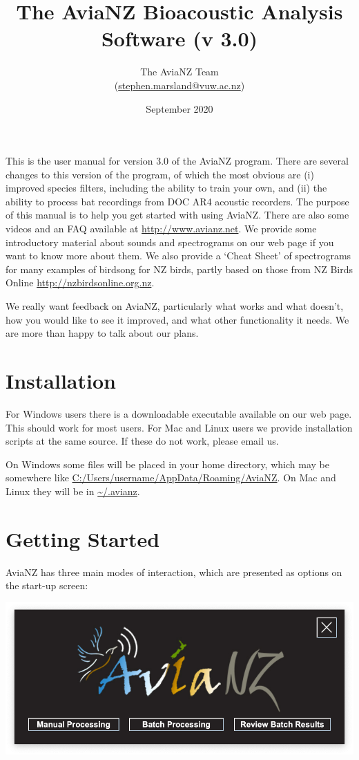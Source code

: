\documentclass{article}
\title{The AviaNZ Bioacoustic Analysis Software (v 3.0)}
\author{The AviaNZ Team \\(\url{stephen.marsland@vuw.ac.nz})}
\date{September 2020}
\begin{document}
\maketitle

This is the user manual for version 3.0 of the AviaNZ program. There are several changes to this version of the program, of which the most obvious are (i) improved species filters, including the ability to train your own, and (ii) the ability to process bat recordings from DOC AR4 acoustic recorders. The purpose of this manual is to help you get started with using AviaNZ. There are also some videos and an FAQ available at \url{http://www.avianz.net}. We provide some introductory material about sounds and spectrograms on our web page if you want to know more about them. We also provide a `Cheat Sheet' of spectrograms for many examples of birdsong for NZ birds, partly based on those from NZ Birds Online \url{http://nzbirdsonline.org.nz}.
 
We really want feedback on AviaNZ, particularly what works and what doesn't, how you would like to see it improved, and what other functionality it needs. We are more than happy to talk about our plans. 

\tableofcontents

\newpage
\section{Installation}

For Windows users there is a downloadable executable available on our web page. This should work for most users. For Mac and Linux users we provide installation scripts at the same source. If these do not work, please email us.

On Windows some files will be placed in your home directory, which may be somewhere like \url{C:/Users/username/AppData/Roaming/AviaNZ}. On Mac and Linux they will be in \url{~/.avianz}. 

\section{Getting Started}

AviaNZ has three main modes of interaction, which are presented as options on the start-up screen:

\begin{center}
\includegraphics[width=.6\textwidth]{Figures/Splashscreen}
\end{center}
\end{document}
